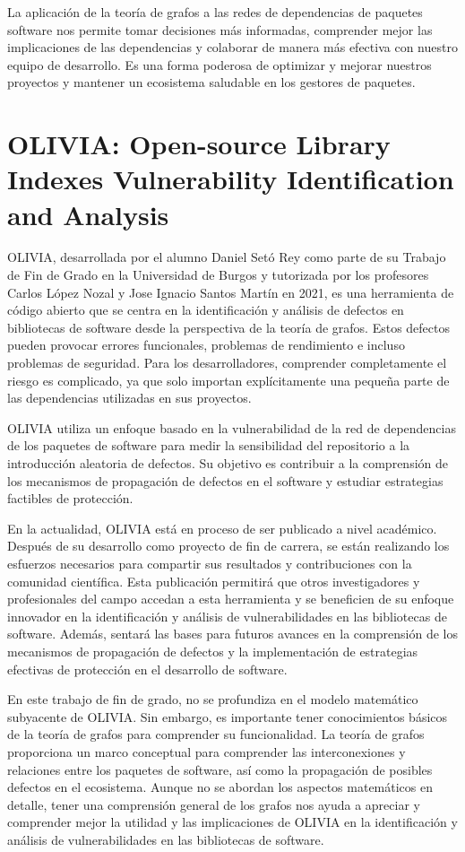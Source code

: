La aplicación de la teoría de grafos a las redes de dependencias de paquetes software nos permite tomar decisiones más informadas, comprender mejor las implicaciones de las dependencias y colaborar de manera más efectiva con nuestro equipo de desarrollo. Es una forma poderosa de optimizar y mejorar nuestros proyectos y mantener un ecosistema saludable en los gestores de paquetes.

\section{OLIVIA: Open-source Library Indexes Vulnerability Identification and Analysis}

OLIVIA, desarrollada por el alumno Daniel Setó Rey como parte de su Trabajo de Fin de Grado en la Universidad de Burgos y tutorizada por los profesores Carlos López Nozal y Jose Ignacio Santos Martín en 2021, es una herramienta de código abierto que se centra en la identificación y análisis de defectos en bibliotecas de software desde la perspectiva de la teoría de grafos. Estos defectos pueden provocar errores funcionales, problemas de rendimiento e incluso problemas de seguridad. Para los desarrolladores, comprender completamente el riesgo es complicado, ya que solo importan explícitamente una pequeña parte de las dependencias utilizadas en sus proyectos.

OLIVIA utiliza un enfoque basado en la vulnerabilidad de la red de dependencias de los paquetes de software para medir la sensibilidad del repositorio a la introducción aleatoria de defectos. Su objetivo es contribuir a la comprensión de los mecanismos de propagación de defectos en el software y estudiar estrategias factibles de protección.

En la actualidad, OLIVIA está en proceso de ser publicado a nivel académico. Después de su desarrollo como proyecto de fin de carrera, se están realizando los esfuerzos necesarios para compartir sus resultados y contribuciones con la comunidad científica. Esta publicación permitirá que otros investigadores y profesionales del campo accedan a esta herramienta y se beneficien de su enfoque innovador en la identificación y análisis de vulnerabilidades en las bibliotecas de software. Además, sentará las bases para futuros avances en la comprensión de los mecanismos de propagación de defectos y la implementación de estrategias efectivas de protección en el desarrollo de software.

En este trabajo de fin de grado, no se profundiza en el modelo matemático subyacente de OLIVIA. Sin embargo, es importante tener conocimientos básicos de la teoría de grafos para comprender su funcionalidad. La teoría de grafos proporciona un marco conceptual para comprender las interconexiones y relaciones entre los paquetes de software, así como la propagación de posibles defectos en el ecosistema. Aunque no se abordan los aspectos matemáticos en detalle, tener una comprensión general de los grafos nos ayuda a apreciar y comprender mejor la utilidad y las implicaciones de OLIVIA en la identificación y análisis de vulnerabilidades en las bibliotecas de software.